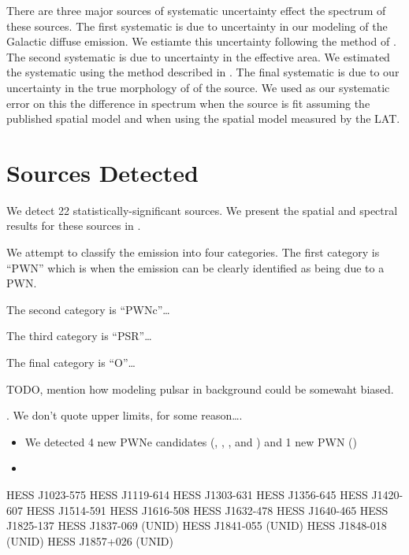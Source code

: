 There are three major sources of systematic uncertainty
effect the spectrum of these sources. The first systematic
is due to uncertainty in our modeling of the Galactic diffuse
emission.  We estiamte this uncertainty following the method of
.  The second systematic is due
to uncertainty in the effective area.  We estimated the systematic
using the method described in \cite{ackermann_2012a_fermi-large}.
The final systematic is due to our uncertainty in the true morphology of
of the source. We used as our systematic error on this the difference
in spectrum when the source is fit assuming the published \tev spatial
model and when using the spatial model measured by the LAT.

\section{Sources Detected}

We detect 22 statistically-significant sources. 
We present the spatial and spectral results for these sources in
.

We attempt to classify the \gev emission into four categories.
The first category is ``PWN'' which is when the emission can be clearly
identified as being due to a \ac{PWN}.

The second category is ``PWNc''\ldots

The third category is ``PSR''\ldots

The final category is ``O''\ldots

TODO, mention how modeling pulsar in background could be somewaht biased.

. We don't quote upper limits, for some reason\ldots.




\begin{itemize}
  \item
    We detected 4 new PWNe candidates (, ,
    ,
    and )
    and 1 new PWN ()
  \item
\end{itemize}



HESS J1023-575
HESS J1119-614
HESS J1303-631
HESS J1356-645
HESS J1420-607
HESS J1514-591
HESS J1616-508
HESS J1632-478
HESS J1640-465
HESS J1825-137
HESS J1837-069 (UNID)
HESS J1841-055 (UNID)
HESS J1848-018 (UNID)
HESS J1857+026 (UNID)



